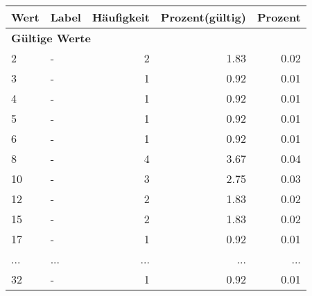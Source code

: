      \begin{longtable}{lXrrr}
     \toprule
     \textbf{Wert} & \textbf{Label} & \textbf{Häufigkeit} & \textbf{Prozent(gültig)} & \textbf{Prozent} \\
     \endhead
     \midrule
     \multicolumn{5}{l}{\textbf{Gültige Werte}}\\
        2 & \multicolumn{1}{X}{-} & %
          \num{2} &
          \num[round-mode=places,round-precision=2]{1,83} &
          \num[round-mode=places,round-precision=2]{0,02} \\
        3 & \multicolumn{1}{X}{-} & %
          \num{1} &
          \num[round-mode=places,round-precision=2]{0,92} &
          \num[round-mode=places,round-precision=2]{0,01} \\
        4 & \multicolumn{1}{X}{-} & %
          \num{1} &
          \num[round-mode=places,round-precision=2]{0,92} &
          \num[round-mode=places,round-precision=2]{0,01} \\
        5 & \multicolumn{1}{X}{-} & %
          \num{1} &
          \num[round-mode=places,round-precision=2]{0,92} &
          \num[round-mode=places,round-precision=2]{0,01} \\
        6 & \multicolumn{1}{X}{-} & %
          \num{1} &
          \num[round-mode=places,round-precision=2]{0,92} &
          \num[round-mode=places,round-precision=2]{0,01} \\
        8 & \multicolumn{1}{X}{-} & %
          \num{4} &
          \num[round-mode=places,round-precision=2]{3,67} &
          \num[round-mode=places,round-precision=2]{0,04} \\
        10 & \multicolumn{1}{X}{-} & %
          \num{3} &
          \num[round-mode=places,round-precision=2]{2,75} &
          \num[round-mode=places,round-precision=2]{0,03} \\
        12 & \multicolumn{1}{X}{-} & %
          \num{2} &
          \num[round-mode=places,round-precision=2]{1,83} &
          \num[round-mode=places,round-precision=2]{0,02} \\
        15 & \multicolumn{1}{X}{-} & %
          \num{2} &
          \num[round-mode=places,round-precision=2]{1,83} &
          \num[round-mode=places,round-precision=2]{0,02} \\
        17 & \multicolumn{1}{X}{-} & %
          \num{1} &
          \num[round-mode=places,round-precision=2]{0,92} &
          \num[round-mode=places,round-precision=2]{0,01} \\
       ... & ... & ... & ... & ... \\
        32 & \multicolumn{1}{X}{-} & %
          \num{1} &
          \num[round-mode=places,round-precision=2]{0,92} &
          \num[round-mode=places,round-precision=2]{0,01} \\


\end{longtable}
